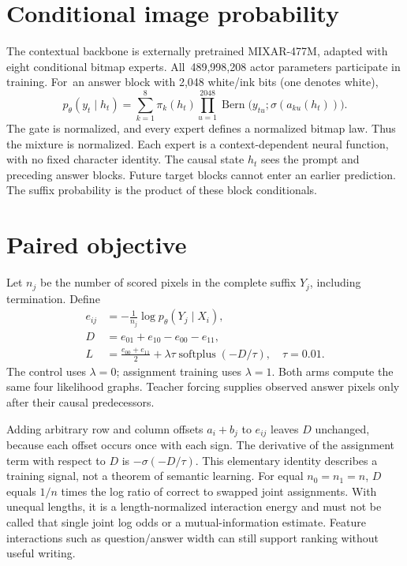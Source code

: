 \documentclass[10pt,a4paper,twocolumn]{article}
\begin{document}
\section*{Conditional image probability}
The contextual backbone is externally pretrained MIXAR-477M\cite{mixar},
adapted with eight conditional bitmap experts. All~489,998,208 actor parameters
participate in training. For~an answer block with 2,048 white/ink bits (one
denotes white),
\begin{equation}
p_\theta(y_t\mid h_t)=\sum_{k=1}^{8}\pi_k(h_t)
\prod_{u=1}^{2048}\operatorname{Bern}
\bigl(y_{tu};\sigma(a_{ku}(h_t))\bigr).
\end{equation}
The gate is normalized, and every expert defines a normalized bitmap law.
Thus the mixture is normalized. Each expert is a context-dependent neural
function, with no fixed character identity. The causal state $h_t$ sees the
prompt and preceding answer blocks. Future target blocks cannot enter an
earlier prediction. The suffix probability is the product of these block
conditionals.

\section*{Paired objective}
Let $n_j$ be the number of scored pixels in the complete suffix $Y_j$,
including termination. Define
\begin{align}
e_{ij}&=-\frac{1}{n_j}\log p_\theta(Y_j\mid X_i),\\
D&=e_{01}+e_{10}-e_{00}-e_{11},\\
L&=\frac{e_{00}+e_{11}}{2}
+\lambda\tau\operatorname{softplus}(-D/\tau),\quad\tau=0.01.
\end{align}
The control uses $\lambda=0$; assignment training uses $\lambda=1$. Both arms
compute the same four likelihood graphs. Teacher forcing supplies observed
answer pixels only after their causal predecessors.

Adding arbitrary row and column offsets $a_i+b_j$ to $e_{ij}$ leaves $D$
unchanged, because each offset occurs once with each sign. The derivative of
the assignment term with respect to $D$ is $-\sigma(-D/\tau)$. This elementary
identity describes a training signal, not a theorem of semantic learning.
For equal $n_0=n_1=n$, $D$ equals $1/n$ times the log ratio of correct to swapped
joint assignments. With unequal lengths, it is a length-normalized interaction
energy and must not be called that single joint log odds or a mutual-information
estimate. Feature interactions such as question/answer width can still support
ranking without useful writing.
\end{document}
